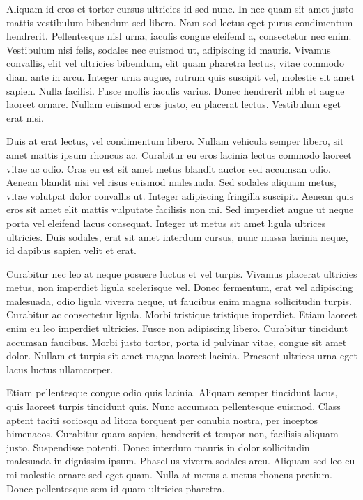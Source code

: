 Aliquam id eros et tortor cursus ultricies id sed nunc.
In nec quam sit amet justo mattis vestibulum bibendum sed libero.
Nam sed lectus eget purus condimentum hendrerit.
Pellentesque nisl urna, iaculis congue eleifend a, consectetur nec enim.
Vestibulum nisi felis, sodales nec euismod ut, adipiscing id mauris.
Vivamus convallis, elit vel ultricies bibendum, elit quam pharetra lectus, vitae commodo diam ante in arcu.
Integer urna augue, rutrum quis suscipit vel, molestie sit amet sapien.
Nulla facilisi.
Fusce mollis iaculis varius.
Donec hendrerit nibh et augue laoreet ornare.
Nullam euismod eros justo, eu placerat lectus.
Vestibulum eget erat nisi.

Duis at erat lectus, vel condimentum libero.
Nullam vehicula semper libero, sit amet mattis ipsum rhoncus ac.
Curabitur eu eros lacinia lectus commodo laoreet vitae ac odio.
Cras eu est sit amet metus blandit auctor sed accumsan odio.
Aenean blandit nisi vel risus euismod malesuada.
Sed sodales aliquam metus, vitae volutpat dolor convallis ut.
Integer adipiscing fringilla suscipit.
Aenean quis eros sit amet elit mattis vulputate facilisis non mi.
Sed imperdiet augue ut neque porta vel eleifend lacus consequat.
Integer ut metus sit amet ligula ultrices ultricies.
Duis sodales, erat sit amet interdum cursus, nunc massa lacinia neque, id dapibus sapien velit et erat.

Curabitur nec leo at neque posuere luctus et vel turpis.
Vivamus placerat ultricies metus, non imperdiet ligula scelerisque vel.
Donec fermentum, erat vel adipiscing malesuada, odio ligula viverra neque, ut faucibus enim magna sollicitudin turpis.
Curabitur ac consectetur ligula.
Morbi tristique tristique imperdiet.
Etiam laoreet enim eu leo imperdiet ultricies.
Fusce non adipiscing libero.
Curabitur tincidunt accumsan faucibus.
Morbi justo tortor, porta id pulvinar vitae, congue sit amet dolor.
Nullam et turpis sit amet magna laoreet lacinia.
Praesent ultrices urna eget lacus luctus ullamcorper.

Etiam pellentesque congue odio quis lacinia.
Aliquam semper tincidunt lacus, quis laoreet turpis tincidunt quis.
Nunc accumsan pellentesque euismod.
Class aptent taciti sociosqu ad litora torquent per conubia nostra, per inceptos himenaeos.
Curabitur quam sapien, hendrerit et tempor non, facilisis aliquam justo.
Suspendisse potenti.
Donec interdum mauris in dolor sollicitudin malesuada in dignissim ipsum.
Phasellus viverra sodales arcu.
Aliquam sed leo eu mi molestie ornare sed eget quam.
Nulla at metus a metus rhoncus pretium.
Donec pellentesque sem id quam ultricies pharetra.


